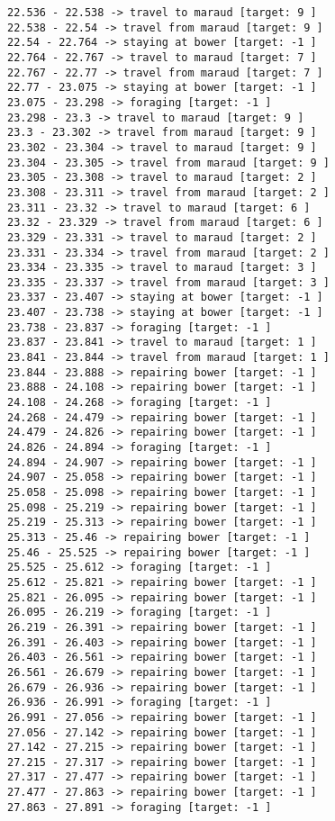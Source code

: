 \documentclass[11pt]{article}
\begin{document}
\begin{Verbatim}[commandchars=\\\{\}]
22.536 - 22.538 -> travel to maraud [target: 9 ]
22.538 - 22.54 -> travel from maraud [target: 9 ]
22.54 - 22.764 -> staying at bower [target: -1 ]
22.764 - 22.767 -> travel to maraud [target: 7 ]
22.767 - 22.77 -> travel from maraud [target: 7 ]
22.77 - 23.075 -> staying at bower [target: -1 ]
23.075 - 23.298 -> foraging [target: -1 ]
23.298 - 23.3 -> travel to maraud [target: 9 ]
23.3 - 23.302 -> travel from maraud [target: 9 ]
23.302 - 23.304 -> travel to maraud [target: 9 ]
23.304 - 23.305 -> travel from maraud [target: 9 ]
23.305 - 23.308 -> travel to maraud [target: 2 ]
23.308 - 23.311 -> travel from maraud [target: 2 ]
23.311 - 23.32 -> travel to maraud [target: 6 ]
23.32 - 23.329 -> travel from maraud [target: 6 ]
23.329 - 23.331 -> travel to maraud [target: 2 ]
23.331 - 23.334 -> travel from maraud [target: 2 ]
23.334 - 23.335 -> travel to maraud [target: 3 ]
23.335 - 23.337 -> travel from maraud [target: 3 ]
23.337 - 23.407 -> staying at bower [target: -1 ]
23.407 - 23.738 -> staying at bower [target: -1 ]
23.738 - 23.837 -> foraging [target: -1 ]
23.837 - 23.841 -> travel to maraud [target: 1 ]
23.841 - 23.844 -> travel from maraud [target: 1 ]
23.844 - 23.888 -> repairing bower [target: -1 ]
23.888 - 24.108 -> repairing bower [target: -1 ]
24.108 - 24.268 -> foraging [target: -1 ]
24.268 - 24.479 -> repairing bower [target: -1 ]
24.479 - 24.826 -> repairing bower [target: -1 ]
24.826 - 24.894 -> foraging [target: -1 ]
24.894 - 24.907 -> repairing bower [target: -1 ]
24.907 - 25.058 -> repairing bower [target: -1 ]
25.058 - 25.098 -> repairing bower [target: -1 ]
25.098 - 25.219 -> repairing bower [target: -1 ]
25.219 - 25.313 -> repairing bower [target: -1 ]
25.313 - 25.46 -> repairing bower [target: -1 ]
25.46 - 25.525 -> repairing bower [target: -1 ]
25.525 - 25.612 -> foraging [target: -1 ]
25.612 - 25.821 -> repairing bower [target: -1 ]
25.821 - 26.095 -> repairing bower [target: -1 ]
26.095 - 26.219 -> foraging [target: -1 ]
26.219 - 26.391 -> repairing bower [target: -1 ]
26.391 - 26.403 -> repairing bower [target: -1 ]
26.403 - 26.561 -> repairing bower [target: -1 ]
26.561 - 26.679 -> repairing bower [target: -1 ]
26.679 - 26.936 -> repairing bower [target: -1 ]
26.936 - 26.991 -> foraging [target: -1 ]
26.991 - 27.056 -> repairing bower [target: -1 ]
27.056 - 27.142 -> repairing bower [target: -1 ]
27.142 - 27.215 -> repairing bower [target: -1 ]
27.215 - 27.317 -> repairing bower [target: -1 ]
27.317 - 27.477 -> repairing bower [target: -1 ]
27.477 - 27.863 -> repairing bower [target: -1 ]
27.863 - 27.891 -> foraging [target: -1 ]

\end{Verbatim}
\end{document}
